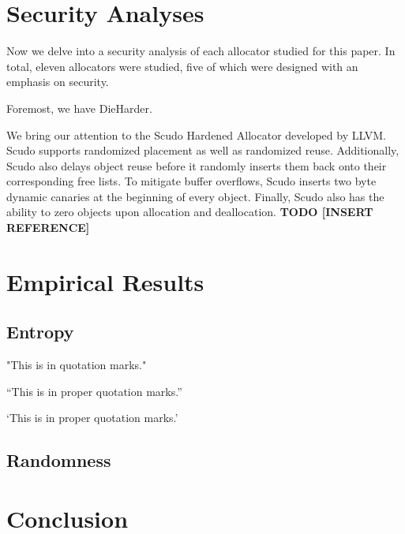 \documentclass[11pt]{article}
\begin{document}
\begin{multicols*}{2}
\section{Security Analyses}

\noindent Now we delve into a security analysis of each allocator studied for this paper. In total, eleven allocators were studied, five of which were designed with an emphasis on security.

Foremost, we have DieHarder.

We bring our attention to the Scudo Hardened Allocator developed by LLVM. 
Scudo supports randomized placement as well as randomized reuse.
Additionally, Scudo also delays object reuse before it randomly inserts them back onto their corresponding free lists.
To mitigate buffer overflows, Scudo inserts two byte dynamic canaries at the beginning of every object.
Finally, Scudo also has the ability to zero objects upon allocation and deallocation. \textbf{TODO [INSERT REFERENCE]}

\section{Empirical Results}

\subsection{Entropy}

"This is in quotation marks."

``This is in proper quotation marks.''

`This is in proper quotation marks.'

\subsection{Randomness}

\section{Conclusion}

\end{multicols*}
\end{document}

